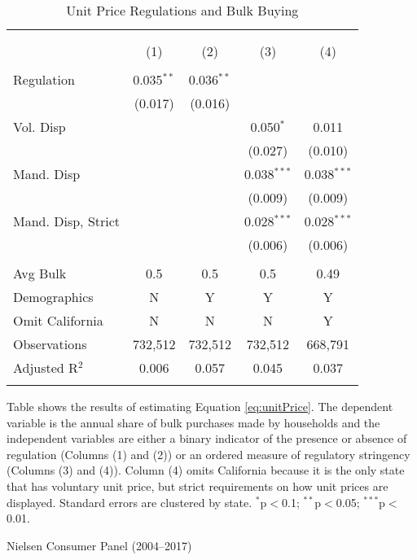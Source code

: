 \begin{table}[!htbp] \centering
  \caption{Unit Price Regulations and Bulk Buying}
  \label{tab:unitPriceLaw}
\begin{tabular}{@{\extracolsep{5pt}}lcccc}
\\[-1.8ex]\hline
\hline \\[-1.8ex]
\\[-1.8ex] & (1) & (2) & (3) & (4)\\
\hline \\[-1.8ex]
 Regulation & 0.035$^{**}$ & 0.036$^{**}$ &  &  \\
  & (0.017) & (0.016) &  &  \\
  Vol. Disp &  &  & 0.050$^{*}$ & 0.011 \\
  &  &  & (0.027) & (0.010) \\
  Mand. Disp &  &  & 0.038$^{***}$ & 0.038$^{***}$ \\
  &  &  & (0.009) & (0.009) \\
  Mand. Disp, Strict &  &  & 0.028$^{***}$ & 0.028$^{***}$ \\
  &  &  & (0.006) & (0.006) \\
 \hline \\[-1.8ex]
Avg Bulk & 0.5 & 0.5 & 0.5 & 0.49 \\
Demographics & N & Y & Y & Y \\
Omit California & N & N & N & Y \\
Observations & 732,512 & 732,512 & 732,512 & 668,791 \\
Adjusted R$^{2}$ & 0.006 & 0.057 & 0.045 & 0.037 \\
\hline
\hline \\[-1.8ex]
\end{tabular}
\begin{tablenotes}
Table shows the results of estimating Equation \ref{eq:unitPrice}. The dependent variable is the annual share of bulk purchases made by households and the independent variables are either a binary indicator of the presence or absence of regulation (Columns (1) and (2)) or an ordered measure of regulatory stringency (Columns (3) and (4)). Column (4) omits California because it is the only state that has voluntary unit price, but strict requirements on how unit prices are displayed. Standard errors are clustered by state. $^{*}$p$<$0.1; $^{**}$p$<$0.05; $^{***}$p$<$0.01.
\end{tablenotes}
\begin{tablenotes}[Source]
Nielsen Consumer Panel (2004--2017)
\end{tablenotes}
\end{table}
